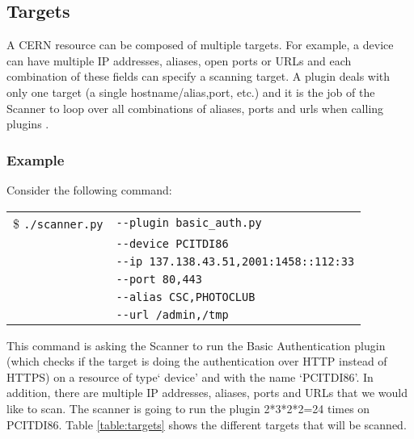\subsection{Targets}
A CERN resource can be composed of multiple targets. For example, a device can have multiple IP addresses, aliases, open ports or URLs and each combination of these fields can specify a scanning target. A plugin deals with only one target (a single hostname/alias,port, etc.) and it is the job of the Scanner to loop over all combinations of aliases, ports and urls when calling plugins .
\subsubsection{Example}
Consider the following command:

\begin{table}[H]
\begin{center}
    \begin{tabular}{ c  l }


\$ \texttt{./scanner.py} &  \texttt{-{}-plugin basic\_auth.py}  \\
			   &  \texttt{-{}-device PCITDI86}  \\
			   &  \texttt{-{}-ip 137.138.43.51,2001:1458::112:33} \\
	           &  \texttt{-{}-port 80,443  }\\
	           &   \texttt{-{}-alias CSC,PHOTOCLUB}  \\
    	       &  \texttt{-{}-url /admin,/tmp}
    	       
	\end{tabular}
    
   \end{center}
\end{table}
\noindent
This command is asking the Scanner to run the Basic Authentication plugin (which checks if the target is doing the authentication over HTTP instead of HTTPS) on a resource of type` device' and with the name `PCITDI86'. In addition, there are multiple IP addresses, aliases, ports and URLs that we would like to scan. The scanner is going to run the plugin 2*3*2*2=24 times on PCITDI86. Table \ref{table:targets} shows the different targets that will be scanned. 

